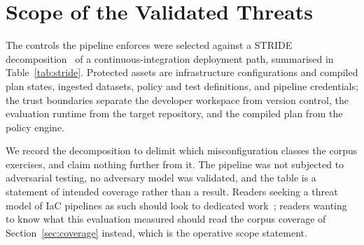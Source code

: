 \documentclass[journal]{IEEEtran}
\begin{document}
\section{Scope of the Validated Threats}

The controls the pipeline enforces were selected against a STRIDE
decomposition~\cite{shostack2014threat} of a continuous-integration deployment
path, summarised in Table~\ref{tab:stride}. Protected assets are infrastructure
configurations and compiled plan states, ingested datasets, policy and test
definitions, and pipeline credentials; the trust boundaries separate the developer
workspace from version control, the evaluation runtime from the target repository,
and the compiled plan from the policy engine.

We record the decomposition to delimit which misconfiguration classes the corpus
exercises, and claim nothing further from it. The pipeline was not subjected to
adversarial testing, no adversary model was validated, and the table is a
statement of intended coverage rather than a result. Readers seeking a threat
model of IaC pipelines as such should look to dedicated
work~\cite{shamim2020xi}; readers wanting to know what this evaluation measured
should read the corpus coverage of Section~\ref{sec:coverage} instead, which is
the operative scope statement.
\end{document}
